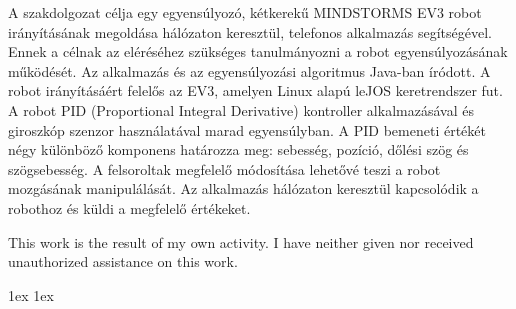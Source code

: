 \documentclass[final]{ubb_dolgozat}
\author{
Márton Zete-Örs
}
\begin{document}
\begin{abstractEN}
	
A szakdolgozat célja egy egyensúlyozó, kétkerekű MINDSTORMS EV3 robot irányításának megoldása hálózaton keresztül, telefonos alkalmazás segítségével. Ennek a célnak az eléréséhez szükséges tanulmányozni a robot egyensúlyozásának működését. Az alkalmazás és az egyensúlyozási algoritmus Java-ban íródott. A robot irányításáért felelős az EV3, amelyen Linux alapú leJOS keretrendszer fut. A robot PID (Proportional Integral Derivative) kontroller alkalmazásával és giroszkóp szenzor használatával marad egyensúlyban. A PID bemeneti értékét négy különböző komponens határozza meg: sebesség, pozíció, dőlési szög és szögsebesség. A felsoroltak megfelelő módosítása lehetővé teszi a robot mozgásának manipulálását. Az alkalmazás hálózaton keresztül kapcsolódik a robothoz és küldi a megfelelő értékeket.

This work is the result of my own activity. I have neither given nor received unauthorized assistance on this work.

\end{abstractEN}

\maketitle

{ \baselineskip 1ex
  \parskip 1ex
  \tableofcontents
}

%



%

%

%

%

%

{ \renewcommand{\baselinestretch}{0.8}\normalsize %
  \setlength{\itemsep}{-2.4mm}
  \setlength{\bibspacing}{0.67\baselineskip}
  
  
}
\end{document}
